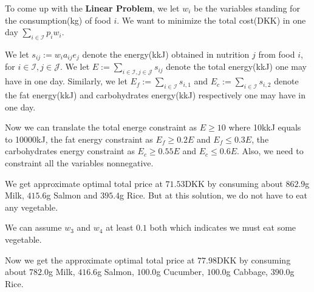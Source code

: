 \documentclass[10pt]{article}
\begin{document}
To come up with the \textbf{Linear Problem}, 
we let $w_i$ be the variables standing for the consumption(kg) of food $i$.
We want to minimize the total cost(DKK) in one day 
$\sum_{i\in\mathcal{I}}p_iw_i$.

We let $s_{ij}:=w_ia_{ij}e_j$ 
denote the energy(kkJ) obtained in nutrition $j$ from food $i$,
for $i\in\mathcal{I},j\in\mathcal{J}$.
We let $E:=\sum_{i\in\mathcal{I},j\in\mathcal{J}}s_{ij}$ 
denote the total energy(kkJ) one may have in one day. 
Similarly, we let $E_f:=\sum_{i\in\mathcal{I}}s_{i,1}$
and $E_c:=\sum_{i\in\mathcal{I}}s_{i,2}$
denote the fat energy(kkJ) and carbohydrates energy(kkJ) respectively one may have in one day.

Now we can translate the total energe constraint as $E\geq10$ 
where 10kkJ equals to 10000kJ,
the fat energy constraint as $E_f\geq0.2E$ and $E_f\leq0.3E$,
the carbohydrates energy constraint as $E_c\geq0.55E$ and $E_c\leq0.6E$.
Also, we need to constraint all the variables nonnegative.

We get approximate optimal total price at $71.53$DKK by consuming about $862.9$g Milk, $415.6$g Salmon and $395.4$g Rice.
But at this solution, we do not have to eat any vegetable. 


We can assume $w_3$ and $w_4$ at least $0.1$ both which indicates we must eat some vegetable.

Now we get the approximate optimal total price at $77.98$DKK by consuming about
$782.0$g Milk, $416.6$g Salmon, $100.0$g Cucumber, $100.0$g Cabbage, $390.0$g Rice.
\end{document}
